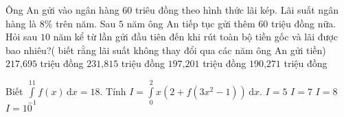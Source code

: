 \begin{ex}%
	Ông An gửi vào ngân hàng $ 60 $ triêu đồng theo hình thức lãi kép. Lãi suất ngân hàng là $ 8 \%$ trên năm. Sau $ 5 $ năm ông An tiếp tục gửi thêm $ 60 $ triệu đồng nữa. Hỏi sau $ 10 $ năm kể từ lần gửi đầu tiên đến khi rút toàn bộ tiền gốc và lãi được bao nhiêu?( biết rằng lãi suất không thay đổi qua các năm ông An gửi tiền)
	\choice
	{\True $ 217\text{,}695 $ triệu đồng}
	{$ 231\text{,}815 $ triệu đồng}
	{$ 197\text{,}201 $ triệu đồng}
	{$ 190\text{,}271 $ triệu đồng}
\end{ex}


\begin{ex}%
	Biết $ \displaystyle\int\limits_{-1}^{11} f(x) \mathrm{\,d} x=18. $ Tính $ I =\displaystyle\int\limits_{0}^{2} x\left(2+f(3x^2-1)\right)\mathrm{\,d}x. $
	\choice
	{$ I=5 $}
	{\True $ I=7 $}
	{$ I=8 $}
	{$ I=10 $}
\end{ex}


